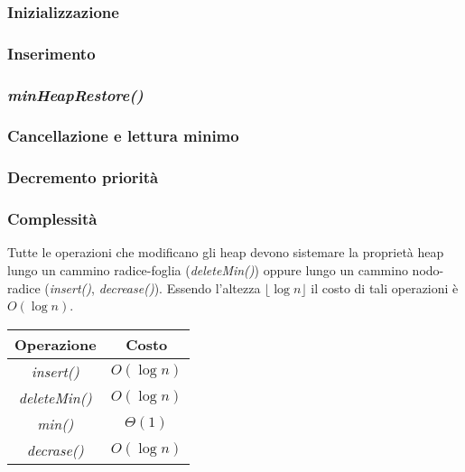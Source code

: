 
\subsubsection{Inizializzazione}

\subsubsection{Inserimento}

\subsubsection{\emph{minHeapRestore()}}

\subsubsection{Cancellazione e lettura minimo}



\subsubsection{Decremento priorit\`a}

\subsubsection{Complessit\`a}
Tutte le operazioni che modificano gli heap devono sistemare la propriet\`a heap lungo un cammino radice-foglia (\emph{deleteMin()}) oppure lungo un cammino
nodo-radice (\emph{insert()}, \emph{decrease()}). Essendo l'altezza $\lfloor\log n\rfloor$ il costo di tali operazioni \`e $O(\log n)$.
\begin{center}
\begin{tabular}{|c|c|}
\hline
Operazione & Costo\\
\hline
\emph{insert()}& $O(\log n)$\\
\hline
\emph{deleteMin()} & $O(\log n)$\\
\hline
\emph{min()} & $\Theta(1)$\\
\hline
\emph{decrase()} & $O(\log n)$\\
\hline
\end{tabular}
\end{center}
